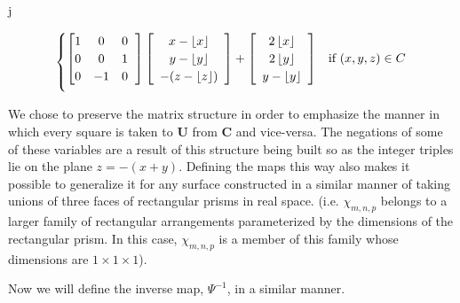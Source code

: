 j\documentclass[]{article}
\begin{document}
\begin{equation}
\begin{cases}
		\left[ \begin{matrix}
		1 & 0 & 0 \\
		0 & 0 & 1 \\
		0 & -1 & 0
		\end{matrix}\hspace{2mm}\right]
		\left[\begin{array}{c}
			x - \left\lfloor x \right\rfloor
			\\ y- \left\lfloor y \right\rfloor
			\\ -(z - \left\lfloor z \right\rfloor)
			\end{array} \right]
		+
			\left[\begin{array}{c}
				2 \left\lfloor x \right\rfloor
				\\ 2\left\lfloor y \right\rfloor
				\\ y - \left\lfloor y \right\rfloor
			\end{array} \right]
				& \text{if } (x,y,z)\in C	\vspace{2mm}
\end{cases}
\end{equation}

We chose to preserve the matrix structure in order to emphasize the manner in which every square is taken to $\mathbf{U}$ from $\mathbf{C}$ and vice-versa. The negations of some of these variables are a result of this structure being built so as the integer triples lie on the plane $z=-(x+y)$. Defining the maps this way also makes it possible to generalize it for any surface constructed in a similar manner of taking unions of three faces of rectangular prisms in real space. (i.e. $\chi_{m,n,p}$ belongs to a larger family of rectangular arrangements parameterized by the dimensions of the rectangular prism. In this case, $\chi_{m,n,p}$ is a member of this family whose dimensions are $1\times1\times1$). 

Now we will define the inverse map, $\Psi^{-1}$, in a similar manner. 
\end{document}
